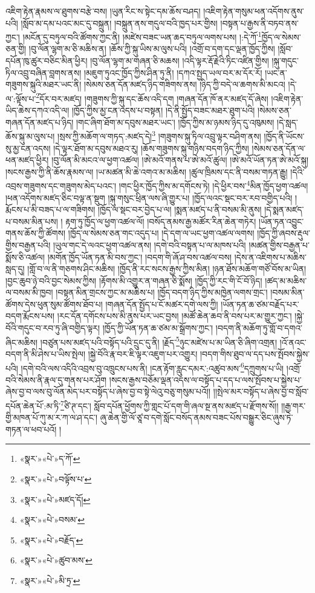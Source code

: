འཇིག་རྟེན་རྣམས་ལ་ཐུགས་བརྩེ་བས། །ཡུན་རིང་ས་སྟེང་དམ་ཆོས་བཤད། །འཇིག་རྟེན་གསུམ་ཕན་འདོགས་ནུས་པའི། །སློབ་མ་དམ་པའང་མང་དུ་བསྐྲུན། །བསྐྲུན་ནས་གདུལ་བའི་ཁྱད་པར་གྱིས། །བསྟན་པ་རྒྱས་ནི་བཏབ་ནས་ཀྱང་། །མངོན་དུ་བཏུལ་བའི་ཚོགས་ཀྱང་ནི། །མཛེས་བཟང་ཡན་ཆད་བཏུལ་ལགས་པས། །:དེ་ཀོ་\footnote{«སྣར་»«པེ་»ད་ཀོ་}ཁྱོད་ལ་སེམས་ཅན་གྱི། །བུ་ལོན་ལྷག་མ་ཅི་མཆིས་ན། །ཆོས་ཀྱི་སྐུ་ཡིས་མ་ལུས་པའི། །འགྲོ་བ་དག་དང་ལྡན་ཁྱོད་ཀྱིས། །སློབ་དཔོན་ཁུ་ཚུར་བཅིང་མིན་ཕྱིར། །བུ་ལོན་ལྷག་མ་གཞན་ཅི་མཆས། །འདི་ལྟར་རྡོ་རྗེའི་ཏིང་འཛིན་གྱིས། །སྐུ་གདུང་ཏིལ་འབྲུ་བཞིན་བླགས་ནས། །མཇུག་ཏུའང་ཁྱོད་ཀྱིས་ཤིན་ཏུ་ནི། །དཀའ་སྤྱད་ཡལ་བར་མ་དོར་རོ། །ཡང་ན་གཟུགས་སྐུའི་མཐར་ཡང་ནི། །སེམས་ཅན་དོན་མཛད་ཉིད་གཟིགས་ནས། །ཉིད་ཀྱི་བདེ་ལ་ཆགས་མི་མངའ། །དེ་ལ་:ལྟོས་པ་\footnote{«སྣར་»«པེ་»བལྟོས་པ་}དོར་བར་མཛད། །གཟུགས་ཀྱི་སྐུ་དང་ཆོས་འདི་དག །གཞན་དོན་ཁོ་ནར་མཛད་དོ་ཞེས། །འཇིག་རྟེན་ཡིད་ཆེས་དཀའ་འདི་ལ། །ཁྱོད་ཀྱིས་མྱ་ངན་འདས་པ་བསྟན། །དེ་ནི་སྤྱོད་བཟང་མཐར་ཐུག་པའི། །སེམས་ཅན་གཞན་དོན་མཛད་པ་ཉིད། །གང་ཞིག་ཐོག་མ་དབུས་མཐར་ཡང་། །ཁྱོད་ཀྱིས་མ་ཉམས་ཉིད་དུ་འཁུམས། །དེ་སླད་ཆོས་སྐུ་མ་ལུས་པ། །སྲས་ཀྱི་མཆོག་ལ་གཏད་:མཛད་དེ།\footnote{«སྣར་»«པེ་»མཛད་དོ།} །གཟུགས་སྐུ་ཏིལ་འབྲུ་ལྟར་བཤིག་ནས། །ཁྱོད་ནི་ཡོངས་སུ་མྱ་ངན་འདས། །དེ་ལྟར་ཐོག་མ་དབུས་མཐའ་རུ། །ཆོས་གཟུགས་སྐུ་གཉིས་བདག་ཉིད་ཀྱིས། །སེམས་ཅན་དོན་ལ་ཕན་མཛད་ཕྱིར། །བུ་ལོན་མི་མངའ་ལ་ཕྱག་འཚལ། །ཨེ་མའོ་གནས་པ་ཨེ་མའོ་ཚུལ། །ཨེ་མའོ་ཡོན་ཏན་ཨེ་མའོ་སྐུ། །སངས་རྒྱས་ཀྱི་ནི་ཆོས་རྣམས་ལ། །ཡ་མཚན་མི་ཆེ་འགའ་མ་མཆིས། །ཚུལ་ཁྲིམས་དང་ནི་བསམ་གཏན་རྒྱུ། །དེའི་འབྲས་གཟུགས་དང་གཟུགས་མེད་པའང་། །གང་ཕྱིར་ཁྱོད་ཀྱིས་མ་དགོངས་ཏེ། །དེ་ཕྱིར་བས་\footnote{«སྣར་»«པེ་»བསམ་}མིན་ཁྱོད་ཕྱག་འཚལ། །ཕན་འདོགས་མཛད་ཅིང་བལྟ་ན་སྡུག །སྐུ་གསུང་ཕྲིན་ལས་ཞི་གྱུར་པ། །ཁྱོད་ལའང་སྡང་བར་རབ་བགྱིད་པའི། །རྨོངས་པ་མི་བཟད་པ་ལ་གཟིགས། །ཁྱོད་ལ་སྡང་བར་བྱེད་པ་ལ། །སྨན་མཛད་པ་ནི་བསམ་མི་ནུས། །དེ་སྨན་མཛད་པ་བསམ་མིན་པས། །
རྟག་ཏུ་ཁྱོད་ལ་ཕྱག་འཚལ་ལོ། །བསོད་ནམས་རྒྱ་མཚོར་རིན་ཆེན་གཏེར། །ཡོན་ཏན་འབྱུང་གནས་ཆོས་ཀྱི་ཚོགས། །ཁྱོད་ལ་སེམས་ཅན་གང་འདུད་པ། །དེ་དག་ལ་ཡང་ཕྱག་འཚལ་ལགས། །ཁྱོད་ཀྱི་ཞབས་རྡུལ་གྱིས་བརྒྱན་པའི། །ཡུལ་གང་དེ་ལའང་ཕྱག་འཚལ་ནས། །དགེ་བའི་བསྟན་པ་ལ་མཁས་པའི། །མཚན་གྱིས་བརྒྱན་པ་སྨོས་ཅི་འཚལ། །མགོན་ཁྱོད་ཡོན་ཏན་མི་བས་ཀྱང་། །བདག་གི་ཞོ་ཤ་བས་འཚལ་བས། །དེས་ན་འཇིགས་པ་མཆིས་སླད་དུ། །གློ་བ་ལ་ནི་གཅགས་ཤིང་མཆིས། །ཁྱོད་ནི་རང་སངས་རྒྱས་ཀྱིས་མིན། །ཉན་ཐོས་མཆོག་གཙོ་བོས་མ་ཡིན། །བྱང་ཆུབ་ཉེ་བའི་བྱང་སེམས་ཀྱིས། །རྟོགས་མི་འགྱུར་ན་གཞན་ཅི་སྨོས། །ཁྱོད་ཀྱི་རང་གི་ངོ་བོ་ཉིད། །ཚད་མ་མཆིས་ལ་བསམ་མི་ཁྱབ། །བསྟན་མིན་གྲངས་ཀྱང་མ་མཆིས་པ། །ཁྱོད་བདག་ཉིད་ཀྱིས་མཁྱེན་ལགས་གྲང་། །བསམ་མིན་ཚོགས་དེས་ཕུན་སུམ་ཚོགས་ཐོབ་པ། །གཞན་དོན་སྤྱོད་པ་ངོ་མཚར་དགེ་ལས་ཀྱི། །ཡོན་ཏན་ཆ་ཙམ་བརྗོད་པར་བདག་རྨོངས་པས། །རང་དོན་དགོངས་པས་མི་ནུས་པར་ཡང་བྱས། །མཚོ་ཆེན་ཆབ་ནི་བས་པར་མ་གྱུར་ཀྱང་། །སྐྱེ་བོའི་གདུང་བ་རབ་ཏུ་ཞི་བགྱིད་ལྟར། །ཁྱོད་ཀྱི་ཡོན་ཏན་ཆ་ཙམ་མ་སྒྲོགས་ཀྱང་། །བདག་ནི་མཆོག་ཏུ་གློ་བ་དགའ་ཞིང་མཆིས། །བཙུན་པས་མཛད་པའི་བསྟོད་པའི་དྲུང་དུ་ནི། །རྗོད་\footnote{«སྣར་»«པེ་»བརྗོད་}ཉུང་མཛེས་པ་མ་ཡིན་ཅི་ཞིག་འགྲན། །འོ་ནའང་བདག་ནི་མི་ཤེས་པ་ཡིས་སྤེལ། །སྐྱེ་བོའི་རྣ་བར་ཇི་ལྟར་འཇུག་པར་འགྱུར། །བདག་གིས་ཐུབ་ལ་དད་པས་སྤོབས་སྐྱེས་པའི། །དགེ་བའི་ལས་འདིའི་འབྲས་བུ་འཁྲུངས་པས་ནི། །ངན་རྟོག་རླུང་དམར་:འཚུབ་མས་\footnote{«སྣར་»«པེ་»ཚུབ་མས་}དཀྲུགས་པ་ཡི། །འགྲོ་བའི་སེམས་ནི་རྣལ་དུ་གནས་པར་ཤོག །སངས་རྒྱས་བཅོམ་ལྡན་འདས་ལ་བསྟོད་པ་དད་པ་ལས་སྤོབས་པ་སྐྱེས་པ་ཞེས་བྱ་བ་ལས་བུ་ལོན་མེད་པར་བསྟོད་པ་ཞེས་བྱ་བ་སྟེ་ལེའུ་བཅུ་གསུམ་པའོ།། །།སྤེལ་མར་བསྟོད་པ་ཞེས་བྱ་བ་སློབ་དཔོན་ཆེན་པོ་:མ་ཏི་\footnote{«སྣར་»«པེ་»མི་ཏྲ་}ཙི་ཊ་དང་། སློབ་དཔོན་ཕྱོགས་ཀྱི་གླང་པོ་དག་གི་ཞལ་སྔ་ནས་མཛད་པ་རྫོགས་སོ།། །།རྒྱ་གར་གྱི་མཁན་པོ་ཀུ་མ་ར་ཀ་ལ་ཤ་དང་། ཞུ་ཆེན་གྱི་ལོ་ཙཱ་བ་དགེ་སློང་བསོད་ནམས་བཟང་པོས་བསྒྱུར་ཅིང་ཞུས་ཏེ་གཏན་ལ་ཕབ་པའོ། ། 